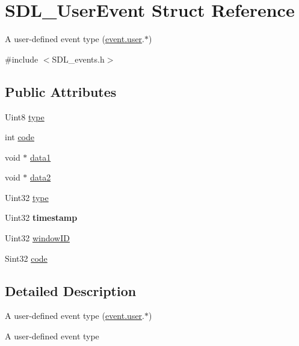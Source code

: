 \hypertarget{structSDL__UserEvent}{\section{S\+D\+L\+\_\+\+User\+Event Struct Reference}
\label{structSDL__UserEvent}
}


A user-\/defined event type (\hyperlink{unionSDL__Event_ab7c394e3ce7bf1e4f8d68bc0e9f1b042}{event.\+user}.$\ast$)  




{\ttfamily \#include $<$S\+D\+L\+\_\+events.\+h$>$}

\subsection*{Public Attributes}
\begin{DoxyCompactItemize}
\item 
Uint8 \hyperlink{structSDL__UserEvent_ab7afa8b98dbd7b52bef41155e10f7340}{type}
\item 
int \hyperlink{structSDL__UserEvent_aef47976781ee82b527a353c5acfa0a34}{code}
\item 
void $\ast$ \hyperlink{structSDL__UserEvent_a754603ee8030d486b86b30cac48b63bd}{data1}
\item 
void $\ast$ \hyperlink{structSDL__UserEvent_a0375c97c4505401f3eede04b73420fa9}{data2}
\item 
Uint32 \hyperlink{structSDL__UserEvent_ab7afa8b98dbd7b52bef41155e10f7340}{type}
\item 
\hypertarget{structSDL__UserEvent_adbf1d34c73138a0c549310e5d4ad0c35}{Uint32 {\bfseries timestamp}}\label{structSDL__UserEvent_adbf1d34c73138a0c549310e5d4ad0c35}

\item 
Uint32 \hyperlink{structSDL__UserEvent_abccefa10e0e0e3a0801bc6d836a08da7}{window\+I\+D}
\item 
Sint32 \hyperlink{structSDL__UserEvent_aef47976781ee82b527a353c5acfa0a34}{code}
\end{DoxyCompactItemize}


\subsection{Detailed Description}
A user-\/defined event type (\hyperlink{unionSDL__Event_ab7c394e3ce7bf1e4f8d68bc0e9f1b042}{event.\+user}.$\ast$) 

A user-\/defined event type 

